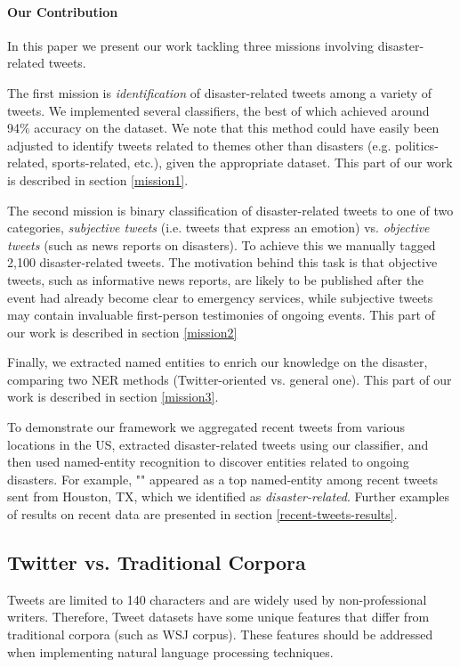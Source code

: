 \documentclass[letterpaper,twocolumn,10pt]{article}
\begin{document}
\paragraph{Our Contribution}

In this paper we present our work tackling three missions involving disaster-related tweets.

The first mission is \textit{identification} of disaster-related tweets among a variety of tweets. We implemented several classifiers, the best of which achieved around 94\% accuracy on the dataset. We note that this method could have easily been adjusted to identify tweets related to themes other than disasters (e.g. politics-related, sports-related, etc.), given the appropriate dataset. This part of our work is described in section \ref{mission1}.

The second mission is binary classification of disaster-related tweets to one of two categories, \textit{subjective tweets} (i.e. tweets that express an emotion) vs. \textit{objective tweets} (such as news reports on disasters). To achieve this we manually tagged 2,100 disaster-related tweets. The motivation behind this task is that objective tweets, such as informative news reports, are likely to be published after the event had already become clear to emergency services, while subjective tweets may contain invaluable first-person testimonies of ongoing events. This part of our work is described in section \ref{mission2}

Finally, we extracted named entities to enrich our knowledge on the disaster, comparing two NER methods (Twitter-oriented vs. general one). This part of our work is described in section \ref{mission3}.

To demonstrate our framework we aggregated recent tweets from various locations in the US, extracted disaster-related tweets using our classifier, and then used named-entity recognition to discover entities related to ongoing disasters. For example, "" appeared as a top named-entity among recent tweets sent from Houston, TX, which we identified as \textit{disaster-related}. Further examples of results on recent data are presented in section \ref{recent-tweets-results}.

\subsection{Twitter vs. Traditional Corpora}

Tweets are limited to 140 characters and are widely used by non-professional writers. Therefore, Tweet datasets have some unique features that differ from traditional corpora (such as WSJ corpus). These features should be addressed when implementing natural language processing techniques.
\end{document}

